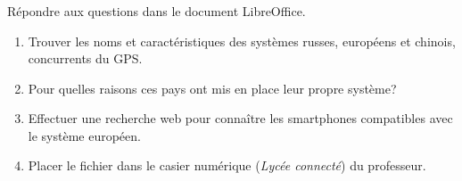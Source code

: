 \documentclass[svgnames,11pt]{beamer}
\begin{document}
\begin{frame}
    \frametitle{}

    \begin{activite}
        Répondre aux questions dans le document LibreOffice.
        \begin{enumerate}
            \item Trouver les noms et caractéristiques des systèmes russes, européens et chinois, concurrents du GPS.
            \item Pour quelles raisons ces pays ont mis en place leur propre système?
            \item Effectuer une recherche web pour connaître les smartphones compatibles avec le système européen.
            \item Placer le fichier dans le casier numérique (\emph{Lycée connecté}) du professeur.
        \end{enumerate}
    \end{activite}

\end{frame}
\end{document}
